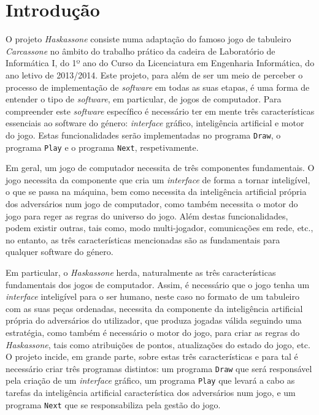 \chapter*{Introdução} 


O projeto \emph{Haskassone} consiste numa adaptação do famoso jogo de tabuleiro \emph{Carcassone} no âmbito
do trabalho prático da cadeira de Laboratório de Informática I, do 1º ano do Curso da Licenciatura em
Engenharia Informática, do ano letivo de 2013/2014. Este projeto, para além de ser um meio de perceber o
processo de implementação de \emph{software} em todas as suas etapas, é uma forma de entender o tipo de
\emph{software}, em particular, de jogos de computador. Para compreender este \emph{software} específico é
necessário ter em mente três características essenciais ao software do género: \emph{interface}
gráfico, inteligência artificial e motor do jogo. Estas funcionalidades serão implementadas no programa
\texttt{Draw}, o programa \texttt{Play} e o programa \texttt{Next}, respetivamente.


Em geral, um jogo de computador necessita de três componentes fundamentais. O jogo necessita da componente
que cria um \emph{interface} de forma a tornar inteligível, o que se passa na máquina, bem como necessita da
inteligência artificial própria dos adversários num jogo de computador, como também necessita o motor do
jogo para reger as regras do universo do jogo. Além destas funcionalidades, podem existir outras, tais como,
modo multi-jogador, comunicações em rede, etc., no entanto, as três características mencionadas são as
fundamentais para qualquer software do género.

Em particular, o \emph{Haskassone} herda, naturalmente as três características fundamentais dos jogos de
computador. Assim, é necessário que o jogo tenha um \emph{interface} inteligível para o ser humano, neste
caso no formato de um tabuleiro com as suas peças ordenadas, necessita da componente da inteligência
artificial própria do adversários do utilizador, que produza jogadas válida seguindo uma estratégia, como
também é necessário o motor do jogo, para criar as regras do \emph{Haskassone}, tais como atribuições de
pontos, atualizações do estado do jogo, etc. O projeto incide, em grande parte, sobre estas três
características e para tal é necessário criar três programas distintos: um programa \texttt{Draw} que
será responsável pela criação de um \emph{interface} gráfico, um programa \texttt{Play} que levará a
cabo as tarefas da inteligência artificial característica dos adversários num jogo, e um programa
\texttt{Next} que se responsabiliza pela gestão do jogo.

